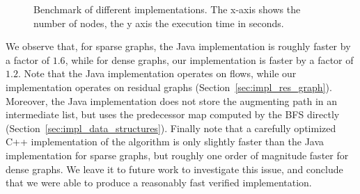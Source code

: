 \documentclass[smallcondensed]{svjour3}     %
\begin{document}
\begin{figure}[!h]
% 
  
  \caption{Benchmark of different implementations. The x-axis shows the number of nodes, the y axis the execution time in seconds.}\label{fig:benchmark}
  \end{figure}

  We observe that, for sparse graphs, the Java implementation is roughly faster by a factor of $1.6$, while for dense graphs, our implementation is faster by a factor of $1.2$. Note that the Java implementation operates on flows, while our implementation 
  operates on residual graphs (\cf Section~\ref{sec:impl_res_graph}). Moreover, the Java implementation does not store the augmenting 
  path in an intermediate list, but uses the predecessor map computed by the BFS directly (\cf Section~\ref{sec:impl_data_structures}).
  Finally note that a carefully optimized C++ implementation of the algorithm is only slightly faster than the Java implementation for sparse graphs,
  but roughly one order of magnitude faster for dense graphs. We leave it to future work to investigate this issue, and conclude that we were able to produce
  a reasonably fast verified implementation.
  
  
% 
% 
    
\end{document}

